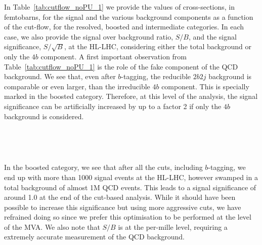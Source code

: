     In Table~\ref{tab:cutflow_noPU_1} we provide
    the values of cross-sections, in femtobarns,
     for the signal
      and the various background
      components as a function of the
      cut-flow, for the resolved,
      boosted and intermediate
      categories.
       In each case, we also provide the signal over
      background ratio, $S/B$, and the signal
      significance, $S/\sqrt{B}$, at the HL-LHC, considering either
      the total background or only the $4b$ component.
      A first important observation from Table~\ref{tab:cutflow_noPU_1}
      is the role of the fake component of the QCD background.
      We see that, even after $b$-tagging, the reducible $2b2j$ background
      is comparable or even larger, than the irreducible
      $4b$ component.
      This is specially marked in the boosted category.
      Therefore, at this level of the analysis, the signal significance
      can be artificially increased by up to a factor 2 if only the
      $4b$ background is considered.

      
    

\begin{table}[t]
  \centering
  \scriptsize
  
  $\,$ \\
  \vspace{0.5cm}
  
  $\,$ \\
  \vspace{0.5cm}
    
    \caption{\small The cross-sections, in femtobarns,
      for the signal and the various background
      processes at different steps of the
      cut-flow, for the resolved (upper table),
      intermediate (middle table) and boosted
      (lower table) categories, for the analysis
      without PU.
      In each case, we also provide the signal over
      background ratio, $S/B$, and the signal
      significance, $S/\sqrt{B}$, considering either
      the total background or only the $4b$ component.
      The different levels of the cut-flow are summarized
      in Table~\ref{tab:cutflowdetails}.
 \label{tab:cutflow_noPU_1}}
\end{table}



%
In the boosted category, we see that after all the cuts, including $b$-tagging,
we end up with more than 1000 signal events at the HL-LHC, however swamped in a total
background of almost 1M QCD events.
%
This leads to a signal significance of around 1.0 at the end of the
cut-based analysis.
%
While it should have been possible to increase this significance
but using more aggressive cuts, we have refrained doing so
since we prefer this optimisation to be performed at the level of
the MVA.
%
We also note that $S/B$ is at the per-mille level, requiring a extremely accurate
measurement of the QCD background.


